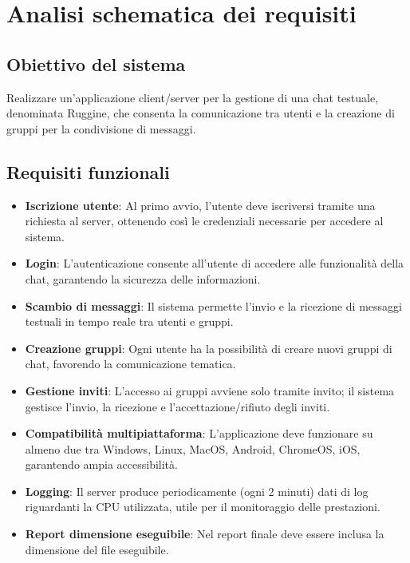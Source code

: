 
\chapter{Analisi schematica dei requisiti}

\section{Obiettivo del sistema}
Realizzare un'applicazione client/server per la gestione di una chat testuale, denominata Ruggine, che consenta la comunicazione tra utenti e la creazione di gruppi per la condivisione di messaggi.

\section{Requisiti funzionali}
\begin{itemize}
	\item \textbf{Iscrizione utente}: Al primo avvio, l'utente deve iscriversi tramite una richiesta al server, ottenendo così le credenziali necessarie per accedere al sistema.
	\item \textbf{Login}: L'autenticazione consente all'utente di accedere alle funzionalità della chat, garantendo la sicurezza delle informazioni.
	\item \textbf{Scambio di messaggi}: Il sistema permette l'invio e la ricezione di messaggi testuali in tempo reale tra utenti e gruppi.
	\item \textbf{Creazione gruppi}: Ogni utente ha la possibilità di creare nuovi gruppi di chat, favorendo la comunicazione tematica.
	\item \textbf{Gestione inviti}: L'accesso ai gruppi avviene solo tramite invito; il sistema gestisce l'invio, la ricezione e l'accettazione/rifiuto degli inviti.
	\item \textbf{Compatibilità multipiattaforma}: L'applicazione deve funzionare su almeno due tra Windows, Linux, MacOS, Android, ChromeOS, iOS, garantendo ampia accessibilità.
	\item \textbf{Logging}: Il server produce periodicamente (ogni 2 minuti) dati di log riguardanti la CPU utilizzata, utile per il monitoraggio delle prestazioni.
	\item \textbf{Report dimensione eseguibile}: Nel report finale deve essere inclusa la dimensione del file eseguibile.
\end{itemize}

